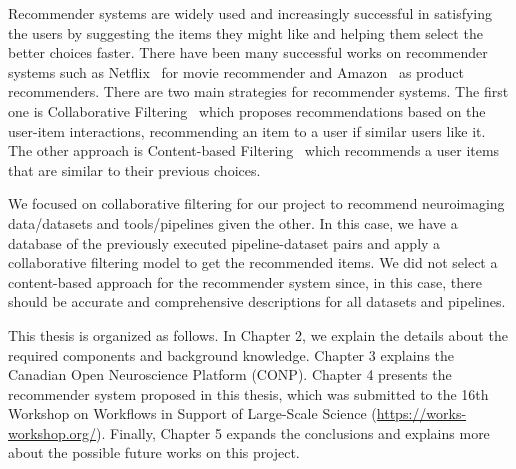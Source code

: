 Recommender systems are widely used and increasingly successful in satisfying the users by suggesting the items they might like and helping them select the better choices faster. There have been many successful works on recommender systems such as Netflix~\cite{bennett2007netflix} for movie recommender and Amazon~\cite{7927889} as product recommenders. There are two main strategies for recommender systems. The first one is Collaborative Filtering~\cite{rajaraman2011mining} which proposes recommendations based on the user-item interactions, recommending an item to a user if similar users like it. The other approach is Content-based Filtering~\cite{pazzani2007content} which recommends a user items that are similar to their previous choices.  

We focused on collaborative filtering for our project to recommend neuroimaging data/datasets and tools/pipelines given the other. In this case, we have a database of the previously executed pipeline-dataset pairs and apply a collaborative filtering model to get the recommended items. We did not select a content-based approach for the recommender system since, in this case, there should be accurate and comprehensive descriptions for all datasets and pipelines.
 


This thesis is organized as follows. In Chapter 2, we explain the details about the required components and background knowledge. Chapter 3 explains the Canadian Open Neuroscience Platform (CONP). Chapter 4 presents the recommender system proposed in this thesis, which was submitted to the 16th Workshop on Workflows in Support of Large-Scale Science (\url{https://works-workshop.org/}). Finally, Chapter 5 expands the conclusions and explains more about the possible future works on this project.




